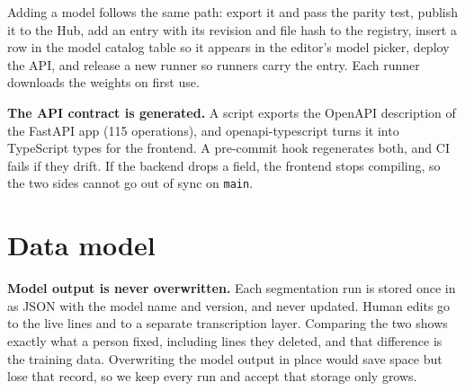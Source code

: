 \documentclass[11pt,a4paper]{article}
\newcommand{\choice}[1]{\par\smallskip\textbf{#1}\enspace}
\begin{document}
Adding a model follows the same path: export it and pass the parity test, publish it to the Hub, add an entry with its revision and file hash to the registry, insert a row in the model catalog table so it appears in the editor's model picker, deploy the API, and release a new runner so runners carry the entry. Each runner downloads the weights on first use.

\choice{The API contract is generated.} A script exports the OpenAPI description of the FastAPI app (115 operations), and openapi-typescript turns it into TypeScript types for the frontend. A pre-commit hook regenerates both, and CI fails if they drift. If the backend drops a field, the frontend stops compiling, so the two sides cannot go out of sync on \texttt{main}.

\section{Data model}\label{sec:data}

\choice{Model output is never overwritten.} Each segmentation run is stored once in  as JSON with the model name and version, and never updated. Human edits go to the live lines and to a separate  transcription layer. Comparing the two shows exactly what a person fixed, including lines they deleted, and that difference is the training data. Overwriting the model output in place would save space but lose that record, so we keep every run and accept that storage only grows.
\end{document}
